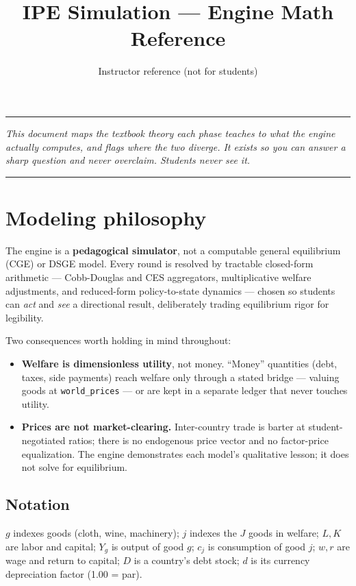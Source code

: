 \documentclass[11pt]{article}
\title{\textbf{IPE Simulation --- Engine Math Reference}}
\author{Instructor reference (not for students)}
\date{}
\newcommand{\code}[1]{\texttt{#1}}
\begin{document}
\maketitle
\vspace{-1.2cm}

\noindent\rule{\textwidth}{0.4pt}
\textit{This document maps the textbook theory each phase teaches to what the
engine actually computes, and flags where the two diverge. It exists so you can
answer a sharp question and never overclaim. Students never see it.}\par
\noindent\rule{\textwidth}{0.4pt}

\section{Modeling philosophy}

The engine is a \textbf{pedagogical simulator}, not a computable general
equilibrium (CGE) or DSGE model. Every round is resolved by tractable
closed-form arithmetic --- Cobb-Douglas and CES aggregators, multiplicative
welfare adjustments, and reduced-form policy-to-state dynamics --- chosen so
students can \emph{act} and \emph{see} a directional result, deliberately
trading equilibrium rigor for legibility.

Two consequences worth holding in mind throughout:
\begin{itemize}
  \item \textbf{Welfare is dimensionless utility}, not money. ``Money''
  quantities (debt, taxes, side payments) reach welfare only through a stated
  bridge --- valuing goods at \code{world\_prices} --- or are kept in a separate
  ledger that never touches utility.
  \item \textbf{Prices are not market-clearing.} Inter-country trade is barter
  at student-negotiated ratios; there is no endogenous price vector and no
  factor-price equalization. The engine demonstrates each model's qualitative
  lesson; it does not solve for equilibrium.
\end{itemize}

\subsection{Notation}
$g$ indexes goods (cloth, wine, machinery); $j$ indexes the $J$ goods in welfare;
$L,K$ are labor and capital; $Y_g$ is output of good $g$; $c_j$ is consumption of
good $j$; $w,r$ are wage and return to capital; $D$ is a country's debt stock;
$d$ is its currency depreciation factor (1.00 = par).
\end{document}
